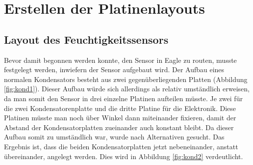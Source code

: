 \section{Erstellen der Platinenlayouts}
\subsection{Layout des Feuchtigkeitssensors} \label{sensorlayout}
Bevor damit begonnen werden konnte, den Sensor in Eagle zu routen, musste festgelegt
werden, inwiefern der Sensor aufgebaut wird. Der Aufbau eines normalen Kondensators
besteht aus zwei gegenüberliegenden Platten (Abbildung \ref{fig:kond1}). Dieser Aufbau würde sich
allerdings als relativ umständlich erweisen, da man somit den Sensor in drei einzelne
Platinen aufteilen müsste. Je zwei für die zwei Kondensatorenplatte und die dritte Platine für
die Elektronik. Diese Platinen müsste man noch über Winkel dann miteinander fixieren,
damit der Abstand der Kondensatorplatten zueinander auch konstant bleibt. Da dieser
Aufbau somit zu umständlich war, wurde nach Alternativen gesucht. Das Ergebnis ist, dass
die beiden Kondensatorplatten jetzt nebeneinander, anstatt übereinander, angelegt werden.
Dies wird in Abbildung \ref{fig:kond2} verdeutlicht.
